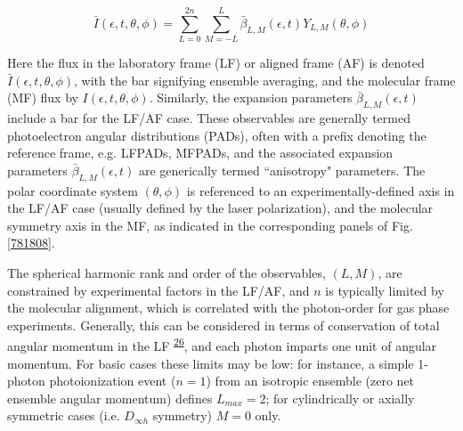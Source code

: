 \documentclass[10pt]{article}
\begin{document}
\begin{equation}
\bar{I}(\epsilon,t,\theta,\phi)=\sum_{L=0}^{2n}\sum_{M=-L}^{L}\bar{\beta}_{L,M}(\epsilon,t)Y_{L,M}(\theta,\phi)\label{eq:AF-PAD-general}
\end{equation}

Here the flux in the laboratory frame (LF) or aligned frame (AF) is denoted $\bar{I}(\epsilon,t,\theta,\phi)$, with the bar signifying ensemble averaging, and the molecular frame (MF) flux by $I(\epsilon,t,\theta,\phi)$.  Similarly, the expansion parameters $\bar{\beta}_{L,M}(\epsilon,t)$ include a bar for the LF/AF case. These observables are generally termed photoelectron angular distributions (PADs), often with a prefix denoting the reference frame, e.g. LFPADs, MFPADs, and the associated expansion parameters $\bar{\beta}_{L,M}(\epsilon,t)$ are generically termed ``anisotropy" parameters. The polar coordinate system $(\theta,\phi)$ is referenced to an experimentally-defined axis in the LF/AF case (usually defined by the laser polarization), and the molecular symmetry axis in the MF, as indicated in the corresponding panels of Fig. \ref{781808}. 

The spherical harmonic rank and order of the observables, $(L,M)$, are constrained by experimental factors in the LF/AF, and $n$ is typically limited by the molecular alignment, which is correlated with the photon-order for gas phase experiments. Generally, this can be considered in terms of conservation of total angular momentum in the LF \textsuperscript{\hyperref[csl:26]{26}}, and each photon imparts one unit of angular momentum. For basic cases these limits may be low: for instance, a simple 1-photon photoionization event ($n=1$) from an isotropic ensemble (zero net ensemble angular momentum) defines $L_{max}=2$; for cylindrically or axially symmetric cases (i.e. $D_{\infty h}$ symmetry) $M=0$ only. 
\end{document}
